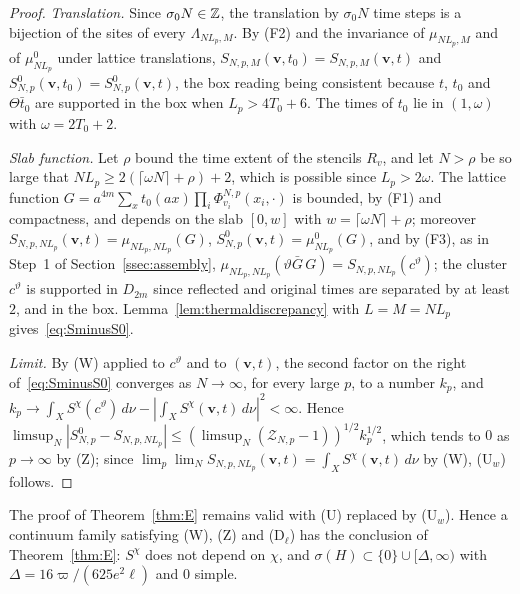 \begin{proof}
\emph{Translation.} Since $\sigma_0N\in\mathbb{Z}$, the translation by $\sigma_0N$
time steps is a bijection of the sites of every $\Lambda_{NL_p,M}$. By (F2)
and the invariance of $\mu_{NL_p,M}$ and of $\mu^0_{NL_p}$ under lattice
translations, $S_{N,p,M}(\mathbf v,t_0)=S_{N,p,M}(\mathbf v,t)$ and
$S^0_{N,p}(\mathbf v,t_0)=S^0_{N,p}(\mathbf v,t)$, the box reading being
consistent because $t$, $t_0$ and $\Theta\bar t_0$ are supported in the box
when $L_p>4T_0+6$. The times of $t_0$ lie in $(1,\omega)$ with
$\omega=2T_0+2$.

\emph{Slab function.} Let $\rho$ bound the time extent of the stencils $R_v$,
and let $N>\rho$ be so large that $NL_p\ge2(\lceil\omega N\rceil+\rho)+2$,
which is possible since $L_p>2\omega$. The lattice function
$G=a^{4m}\sum_xt_0(ax)\prod_i\Phi^{N,p}_{v_i}(x_i,\cdot)$ is bounded, by (F1)
and compactness, and depends on the slab $[0,w]$ with $w=\lceil\omega N
\rceil+\rho$; moreover $S_{N,p,NL_p}(\mathbf v,t)=\mu_{NL_p,NL_p}(G)$,
$S^0_{N,p}(\mathbf v,t)=\mu^0_{NL_p}(G)$, and by (F3), as in Step~1 of
Section~\ref{ssec:assembly}, $\mu_{NL_p,NL_p}(\vartheta\bar G\,G)=
S_{N,p,NL_p}(c^\vartheta)$; the cluster $c^\vartheta$ is supported in $D_{2m}$
since reflected and original times are separated by at least $2$, and in
the box. Lemma~\ref{lem:thermaldiscrepancy} with $L=M=NL_p$
gives~\eqref{eq:SminusS0}.

\emph{Limit.} By (W) applied to $c^\vartheta$ and to $(\mathbf v,t)$, the
second factor on the right of~\eqref{eq:SminusS0} converges as $N\to\infty$,
for every large $p$, to a number $k_p$, and $k_p\to\int_XS^\chi(c^\vartheta)
\,d\nu-|\int_XS^\chi(\mathbf v,t)\,d\nu|^2<\infty$. Hence
$\limsup_N|S^0_{N,p}-S_{N,p,NL_p}|\le(\limsup_N(\mathcal Z_{N,p}-1))^{1/2}
k_p^{1/2}$, which tends to $0$ as $p\to\infty$ by (Z); since
$\lim_p\lim_NS_{N,p,NL_p}(\mathbf v,t)=\int_XS^\chi(\mathbf v,t)\,d\nu$ by (W),
(U$_w$) follows.
\end{proof}

\begin{corollary}\label{cor:Z}
The proof of Theorem~\ref{thm:E} remains valid with \textup{(U)} replaced
by \textup{(U$_w$)}. Hence a continuum family satisfying \textup{(W)},
\textup{(Z)} and \textup{(D$_\ell$)} has the conclusion of
Theorem~\ref{thm:E}: $S^\chi$ does not depend on $\chi$, and
$\sigma(H)\subset\{0\}\cup[\Delta,\infty)$ with $\Delta=16\varpi/(625e^2\ell)$
and $0$ simple.
\end{corollary}

